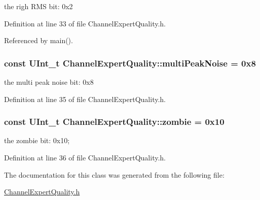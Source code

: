 the righ R\-M\-S bit\-: 0x2 



Definition at line 33 of file Channel\-Expert\-Quality.\-h.



Referenced by main().

\hypertarget{class_channel_expert_quality_a13046f6e61373f907a79326530ee2e07}{
\subsubsection[{multi\-Peak\-Noise}]{\setlength{\rightskip}{0pt plus 5cm}const U\-Int\-\_\-t Channel\-Expert\-Quality\-::multi\-Peak\-Noise = 0x8\hspace{0.3cm}{\ttfamily [static]}}}\label{class_channel_expert_quality_a13046f6e61373f907a79326530ee2e07}


the multi peak noise bit\-: 0x8 



Definition at line 35 of file Channel\-Expert\-Quality.\-h.

\hypertarget{class_channel_expert_quality_a260970cb0e2fe88bfc6cf741ca95b104}{
\subsubsection[{zombie}]{\setlength{\rightskip}{0pt plus 5cm}const U\-Int\-\_\-t Channel\-Expert\-Quality\-::zombie = 0x10\hspace{0.3cm}{\ttfamily [static]}}}\label{class_channel_expert_quality_a260970cb0e2fe88bfc6cf741ca95b104}


the zombie bit\-: 0x10; 



Definition at line 36 of file Channel\-Expert\-Quality.\-h.



The documentation for this class was generated from the following file\-:\begin{DoxyCompactItemize}
\item 
\hyperlink{_channel_expert_quality_8h}{Channel\-Expert\-Quality.\-h}\end{DoxyCompactItemize}
